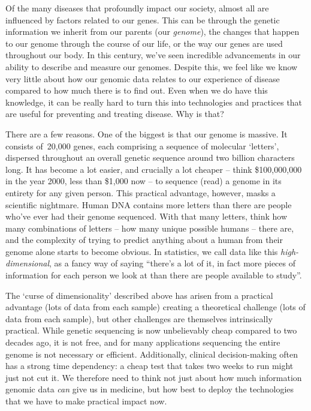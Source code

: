 \documentclass[../thesis.tex]{subfiles}
\begin{document}
Of the many diseases that profoundly impact our society, almost all are influenced by factors related to our genes. This can be through the genetic information we inherit from our parents (our \emph{genome}), the changes that happen to our genome through the course of our life, or the way our genes are used throughout our body. In this century, we've seen incredible advancements in our ability to describe and measure our genomes. Despite this, we feel like we know very little about how our genomic data relates to our experience of disease compared to how much there is to find out. Even when we do have this knowledge, it can be really hard to turn this into technologies and practices that are useful for preventing and treating disease. Why is that?

There are a few reasons. One of the biggest is that our genome is massive. It consists of~20,000 genes, each comprising a sequence of molecular `letters', dispersed throughout an overall genetic sequence around two billion characters long. It has become a lot easier, and crucially a lot cheaper -- think \$100,000,000 in the year 2000, less than \$1,000 now -- to sequence (read) a genome in its entirety for any given person. This practical advantage, however, masks a scientific nightmare. Human DNA contains more letters than there are people who've ever had their genome sequenced. With that many letters, think how many combinations of letters -- how many unique possible humans -- there are, and the complexity of trying to predict anything about a human from their genome alone starts to become obvious. In statistics, we call data like this \emph{high-dimensional}, as a fancy way of saying ``there's a lot of it, in fact more pieces of information for each person we look at than there are people available to study''. 

The `curse of dimensionality' described above has arisen from a practical advantage (lots of data from each sample) creating a theoretical challenge (lots of data from each sample), but other challenges are themselves intrinsically practical. While genetic sequencing is now unbelievably cheap compared to two decades ago, it is not free, and for many applications sequencing the entire genome is not necessary or efficient. Additionally, clinical decision-making often has a strong time dependency: a cheap test that takes two weeks to run might just not cut it. We therefore need to think not just about how much information genomic data \emph{can} give us in medicine, but how best to deploy the technologies that we have to make practical impact now.
\end{document}
